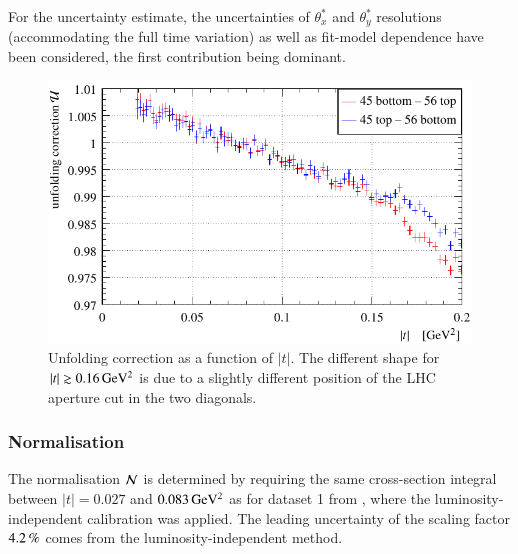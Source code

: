 For the uncertainty estimate, the uncertainties of $\theta_x^*$ and $\theta_y^*$ resolutions (accommodating the full time variation) as well as fit-model dependence have been considered, the first contribution being dominant.


\begin{figure}
\begin{center}
\includegraphics{fig/unfolding_correction_comparison.pdf}
\vskip-3mm
\caption{%
Unfolding correction as a function of $|t|$. The different shape for $|t| \gtrsim 0.16\,{\rm GeV^2}$ is due to a slightly different position of the LHC aperture cut in the two diagonals.
}
\label{fig:unfolding}
\end{center}
\end{figure}


\subsubsection{Normalisation}
\label{sec:normalisation}

The normalisation ${\cal N}$ is determined by requiring the same cross-section integral between $|t| = 0.027$ and $0.083\,{\rm GeV^2}$ as for dataset 1 from \cite{prl111}, where the luminosity-independent calibration was applied. The leading uncertainty of the scaling factor $4.2\,{\rm \%}$ comes from the luminosity-independent method.



